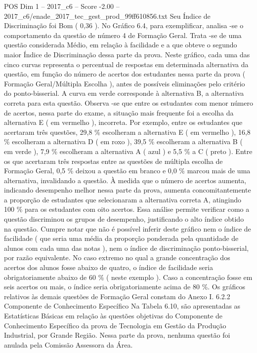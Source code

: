 \begin{textsample}{POS Dim 1 – 2017\_c6 – Score -2.00 – 2017\_c6/enade\_2017\_tec\_gest\_prod\_99ff610856.txt}
Seu Índice de Discriminação foi Bom ( 0,36 ).
No Gráfico 6.4, para exemplificar, analisa -se o comportamento da questão de número 4 de Formação Geral.
Trata -se de uma questão considerada Médio, em relação à facilidade e a que obteve o segundo maior Índice de Discriminação dessa parte da prova.
Neste gráfico, cada uma das cinco curvas representa o percentual de respostas em determinada alternativa da questão, em função do número de acertos dos estudantes nessa parte da prova ( Formação Geral/Múltipla Escolha ), antes de possíveis eliminações pelo critério do ponto-bisserial.
A curva em verde corresponde à alternativa B, a alternativa correta para esta questão.
Observa -se que entre os estudantes com menor número de acertos, nessa parte do exame, a situação mais frequente foi a escolha da alternativa E ( em vermelho ), incorreta.
Por exemplo, entre os estudantes que acertaram três questões, 29,8 \% escolheram a alternativa E ( em vermelho ), 16,8 \% escolheram a alternativa D ( em roxo ), 39,5 \% escolheram a alternativa B ( em verde ), 7,9 \% escolheram a alternativa A ( azul ) e 5,5 \% a C ( preto ).
Entre os que acertaram três respostas entre as questões de múltipla escolha de Formação Geral, 0,5 \% deixou a questão em branco e 0,0 \% marcou mais de uma alternativa, invalidando a questão.
À medida que o número de acertos aumenta, indicando desempenho melhor nessa parte da prova, aumenta concomitantemente a proporção de estudantes que selecionaram a alternativa correta A, atingindo 100 \% para os estudantes com oito acertos.
Essa análise permite verificar como a questão discriminou os grupos de desempenho, justificando o alto índice obtido na questão.
Cumpre notar que não é possível inferir deste gráfico nem o índice de facilidade ( que seria uma média da proporção ponderada pela quantidade de alunos com cada uma das notas ), nem o índice de discriminação ponto-bisserial, por razão equivalente.
No caso extremo no qual a grande concentração dos acertos dos alunos fosse abaixo de quatro, o índice de facilidade seria obrigatoriamente abaixo de 60 \% ( neste exemplo ).
Caso a concentração fosse em seis acertos ou mais, o índice seria obrigatoriamente acima de 80 \%.
Os gráficos relativos às demais questões de Formação Geral constam do Anexo I. 6.2.2 Componente de Conhecimento Específico Na Tabela 6.10, são apresentadas as Estatísticas Básicas em relação às questões objetivas do Componente de Conhecimento Específico da prova de Tecnologia em Gestão da Produção Industrial, por Grande Região.
Nessa parte da prova, nenhuma questão foi anulada pela Comissão Assessora da Área.

\end{textsample}
